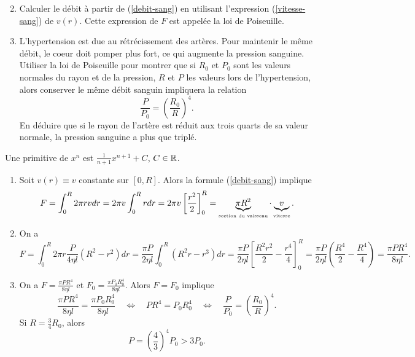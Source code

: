 \documentclass[11pt,class=report,crop=false]{standalone}
\begin{document}
\begin{enumerate}\setcounter{enumi}{1}
	\item Calculer le débit à partir de (\ref{debit-sang}) en utilisant 
	l'expression (\ref{vitesse-sang}) de $v(r)$. Cette expression de $F$ 
	est appelée la loi de Poiseuille.
	\item L'hypertension est due au rétrécissement des artères. Pour maintenir 
	le même débit, le coeur doit pomper plus fort, ce qui augmente la pression 
	sanguine. Utiliser la loi de Poiseuille pour montrer que si $R_0$ et $P_0$ 
	sont les valeurs normales du rayon et de la pression, $R$ et $P$ les valeurs 
	lors de l'hypertension, alors conserver le même débit sanguin impliquera la 
	relation
	\begin{equation}
	\frac P {P_0} = \left(\frac {R_0} R\right) ^4.
	\end{equation}
	En déduire que si le rayon de l'artère est réduit aux trois quarts de sa 
	valeur normale, la pression sanguine a plus que triplé.
\end{enumerate}
\finenonce

\indication
Une primitive de $ x^n $ est $ \frac{1}{n+1} x^{n+1} + C $, $ C \in \mathbb{R} $.  
\finindication

\correction


\sauteligne
\begin{enumerate} 
	\item 
	Soit $v(r) \equiv v$ constante sur $[0,R]$. Alors la formule (\ref{debit-sang}) 
	implique 
	\begin{equation*} 
		F = \int_0^R 2 \pi r v dr = 2 \pi v \int_0^R r dr 
		= 2 \pi v \left[\frac{r^2}{2}\right]_0^R 
		= \underbrace{\pi R^2}_{\text{\tiny section du vaisseau}} \cdot 
		\underbrace{v}_{\text{\tiny vitesse}}.  
	\end{equation*} 

	\item 
	On a 
	\begin{equation*} 
		F = \int_0^R 2 \pi r \frac {P} {4 \eta l} (R^2-r^2) dr 
		= \frac{\pi P}{2 \eta l} \int_0^R (R^2 r -r^3) dr 
		= \frac{\pi P}{2 \eta l} \left[\frac{R^2 r^2}{2} - \frac{r^4}{4}\right]_0^R 
		= \frac{\pi P}{2 \eta l} \left(\frac{R^4}{2} - \frac{R^4}{4}\right) 
		= \frac{\pi P R^4}{8 \eta l}. 
	\end{equation*} 
	\item 
	On a $ F = \frac{\pi P R^4}{8 \eta l} $ et $ F_0 = \frac{\pi P_0 R_0^4}{8 \eta l} $. 
	Alors $ F = F_0 $ implique 
	\begin{equation*} 
		\frac{\pi P R^4}{8 \eta l} = \frac{\pi P_0 R_0^4}{8 \eta l} 
		\quad \Longleftrightarrow \quad 
		P R^4 = P_0 R_0^4 
		\quad \Longleftrightarrow \quad 
		\frac{P}{P_0} = \left(\frac{R_0}{R}\right)^4. 
	\end{equation*} 
	Si $ R = \frac{3}{4} R_0 $, alors 
	\begin{equation*} 
		P = \left(\frac{4}{3}\right)^4 P_0 > 3 P_0. 
	\end{equation*} 
\end{enumerate} 
\fincorrection
\finexercice
\end{document}
